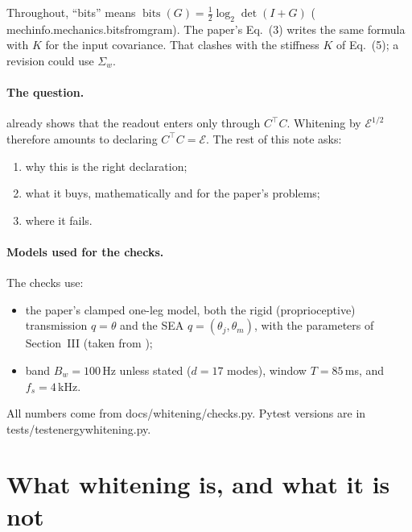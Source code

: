 \documentclass[11pt]{article}
\theoremstyle{definition}
\theoremstyle{remark}
\newcommand{\bits}{\operatorname{bits}}
\newcommand{\Em}{\mathcal{E}}         %
\newcommand{\codeus}{\textunderscore\allowbreak}
\newcommand{\code}[1]{{\ttfamily\let\_\codeus\hyphenchar\font=-1 #1}}
\begin{document}
Throughout, ``bits'' means $\bits(G)=\tfrac12\log_2\det(I+G)$
(\code{mechinfo.mechanics.bits\_from\_gram}). The paper's Eq.~(3) writes the same formula
with $K$ for the input covariance. That clashes with the stiffness $K$ of Eq.~(5); a
revision could use $\Sigma_w$.

\paragraph{The question.}  already shows that the readout enters only
through $C^\top C$. Whitening by $\Em^{1/2}$ therefore amounts to declaring
$C^\top C=\Em$. The rest of this note asks:
\begin{enumerate}[nosep]
  \item why this is the right declaration;
  \item what it buys, mathematically and for the paper's problems;
  \item where it fails.
\end{enumerate}

\paragraph{Models used for the checks.} The checks use:
\begin{itemize}[nosep]
  \item the paper's clamped one-leg model, both the rigid (proprioceptive) transmission
        $q=\theta$ and the SEA $q=(\theta_j,\theta_m)$, with the parameters of Section~III
        (taken from \citet{wensing2017proprioceptive});
  \item band $B_w=100$\,Hz unless stated ($d=17$ modes), window $T=85$\,ms, and
        $f_s=4$\,kHz.
\end{itemize}
All numbers come from \code{docs/whitening/checks.py}. Pytest versions are in
\code{tests/test\_energy\_whitening.py}.

\section{What whitening is, and what it is not}
\label{sec:what}
\end{document}
